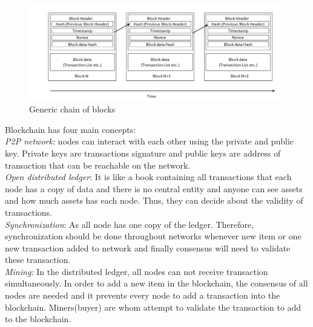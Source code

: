 \begin{center}
	\begin{figure}[htb!]
		
		\begin{minipage}{0.55\linewidth}
			\centering
			\includegraphics[width=1.95\textwidth]{images/chap01_BlockChain.png}
		\end{minipage}
		\caption[Generic chain of blocks]{Generic chain of blocks}
		
		
	\end{figure}
	
\end{center}
Blockchain has four main concepts: \\
\textit{P2P network:} nodes can interact with each other using the private and public key. Private keys are transactions signature and public keys are  address of transaction that can be reachable on the network. \\
\textit{Open distributed ledger}: It is like a book containing all transactions that each node has a copy of data and there is no central entity and anyone can see assets and how much assets has each node. Thus, they can decide about the validity of transactions.\\
\textit{Synchronization}: As all node has one copy of the ledger. Therefore, synchronization should be done throughout networks whenever new item or one new transaction added to network and finally consensus will need to validate these transaction.\\
\textit{Mining: }In the distributed ledger, all nodes can not receive transaction simultaneously. In order to add a new item in the blockchain, the consensus of all nodes are needed and it prevents every node to add a transaction into the blockchain. Miners(buyer) are whom attempt to validate the transaction to add to the blockchain.\\
